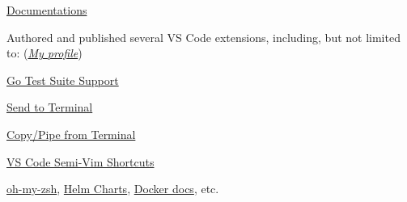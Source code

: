 \documentclass[9pt,a4paper]{extarticle}
\begin{document}
\begin{customitemize}
\begin{customitemize}
\begin{customitemize}
\begin{customitemize}
                \item{\href{https://github.com/microsoft/vscode-docs/pulls?q=is\%3Apr+author\%3Ababakks}{Documentations }}
            \end{customitemize}
            \item{Authored and published several VS Code extensions, including, but not limited to: (\href{https://marketplace.visualstudio.com/publishers/babakks}{\textit{My profile}})}
            \begin{customitemize}
                \item{\href{https://marketplace.visualstudio.com/items?itemName=babakks.vscode-go-test-suite}{Go Test Suite Support} }
                \item{\href{https://marketplace.visualstudio.com/items?itemName=babakks.vscode-send-to-terminal}{Send to Terminal} }
                \item{\href{https://marketplace.visualstudio.com/items?itemName=babakks.vscode-copy-from-terminal}{Copy/Pipe from Terminal} }
                \item{\href{https://marketplace.visualstudio.com/items?itemName=babakks.vscode-vim-shortcuts}{VS Code Semi-Vim Shortcuts} }
            \end{customitemize}
        \end{customitemize}
        \item {}
        \begin{customitemize}
            \item{
            \href{https://github.com/ohmyzsh/ohmyzsh/pulls?q=author\%3Ababakks}{oh-my-zsh},
            \href{https://github.com/helm/charts/pulls?q=is\%3Apr+author%3Ababakks}{Helm Charts},
                \href{https://github.com/docker-library/docs/pulls?q=is\%3Apr+author\%3Ababakks}{Docker docs},
                etc.
            }
        \end{customitemize}
    \end{customitemize}


\end{customitemize}
\end{document}
